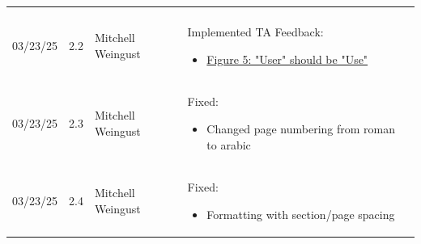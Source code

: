 \documentclass[12pt]{article}
\begin{document}
\begin{table}[H]
\begin{tabularx}{\textwidth}{p{1.5cm} p{1cm} p{3.5cm} X}
\begin{itemize}[leftmargin=*]
      \end{itemize} \\
      03/23/25 & 2.2 & Mitchell Weingust & Implemented TA Feedback: 
      \begin{itemize}[leftmargin=*]
        \item \href{https://github.com/parishanizam/TeleHealth/issues/192}{Figure 5: "User" should be "Use"}
      \end{itemize} \\
      03/23/25 & 2.3 & Mitchell Weingust & Fixed:
      \begin{itemize}[leftmargin=*]
        \item Changed page numbering from roman to arabic
      \end{itemize} \\
      03/23/25 & 2.4 & Mitchell Weingust & Fixed: 
      \begin{itemize}[leftmargin=*]
        \item Formatting with section/page spacing
      \end{itemize} \\
    \end{tabularx}
  \end{table}

\newpage
\end{document}
